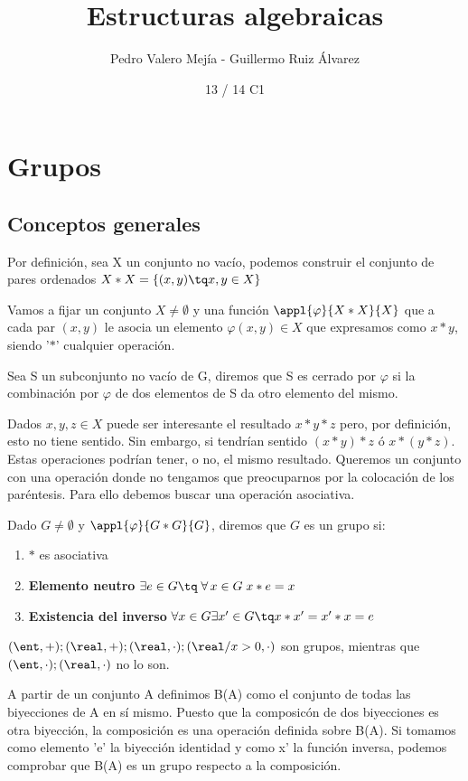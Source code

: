 \documentclass{apuntes}
\title{Estructuras algebraicas}
\author{Pedro Valero Mejía - Guillermo Ruiz Álvarez}
\date{13 / 14 C1}
\begin{document}
\pagestyle{plain}
\maketitle
\tableofcontents
\newpage

\section{Grupos}
 
 \subsection{Conceptos generales}
 Por definición, sea X un conjunto no vacío, podemos construir el conjunto de pares ordenados $X\ast X=\{(x,y)\tq x,y\in X\}$
 
 Vamos a fijar un conjunto $X\neq \emptyset$  y una función $\appl{\varphi}{X\ast X}{X}$ que a cada par $(x,y)$ le 
 asocia un elemento $\varphi(x,y) \in X$ que expresamos como $x\ast y$, siendo '$\ast$' cualquier operación.
 
 \begin{defn}
  Sea S un subconjunto no vacío de G, diremos que S es cerrado por $\varphi$  si la combinación por $\varphi$  de dos elementos de
  S da otro elemento del mismo.
 \end{defn}
 
 Dados $x,y,z \in X$ puede ser interesante el resultado $x\ast y\ast z$ pero, por definición, esto no tiene sentido. Sin embargo, si tendrían 
 sentido $(x\ast y)\ast z$ ó $x\ast (y\ast z)$. Estas operaciones podrían tener, o no, el mismo resultado. Queremos un conjunto con una operación 
 donde no tengamos que preocuparnos por la colocación de los paréntesis. Para ello debemos buscar una operación asociativa.
 
 \begin{defn}[Grupo]
 Dado $G\neq \emptyset$  y $\appl{\varphi}{G\ast G}{G}$, diremos que $G$ es un grupo si:
 \begin{enumerate}
  \item $\ast$ es asociativa
  \item \textbf{Elemento neutro} $\exists  e \in G \tq \; \forall\, x\in G\; x\ast e=x$
  \item \textbf{Existencia del inverso} $\forall x \in G \exists x' \in G \tq x\ast x'=x'\ast x=e$
 \end{enumerate}
\end{defn}

 \begin{example}
   $ (\ent, +); (\real, +); (\real, \cdot); (\real/x>0, \cdot)$ son grupos, mientras que 
   $(\ent, \cdot); (\real, \cdot)$ no lo son.
   
   A partir de un conjunto A definimos B(A) como el conjunto de todas las biyecciones de A en sí mismo. Puesto que la composicón 
   de dos biyecciones es otra biyección, la composición es una operación definida sobre B(A). Si tomamos como elemento 'e' la biyección 
   identidad y como x' la función inversa, podemos comprobar que B(A) es un grupo respecto a la composición.
 \end{example}
  
\end{document}
